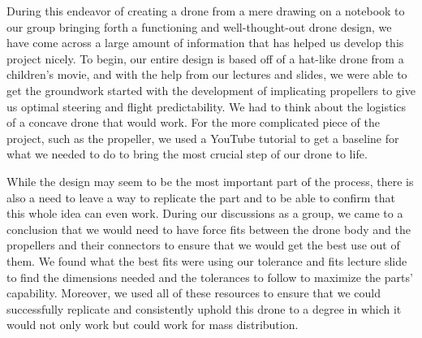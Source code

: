 
During this endeavor of creating a drone from a mere drawing on a notebook to our group bringing forth a functioning and well-thought-out drone design, we have come across a large amount of information that has helped us develop this project nicely. To begin, our entire design is based off of a hat-like drone from a children's movie, and with the help from our lectures and slides, we were able to get the groundwork started with the development of implicating propellers to give us optimal steering and flight predictability. We had to think about the logistics of a concave drone that would work. For the more complicated piece of the project, such as the propeller, we used a YouTube tutorial to get a baseline for what we needed to do to bring the most crucial step of our drone to life. \par

While the design may seem to be the most important part of the process, there is also a need to leave a way to replicate the part and to be able to confirm that this whole idea can even work. During our discussions as a group, we came to a conclusion that we would need to have force fits between the drone body and the propellers and their connectors to ensure that we would get the best use out of them. We found what the best fits were using our tolerance and fits lecture slide to find the dimensions needed and the tolerances to follow to maximize the parts’ capability. Moreover, we used all of these resources to ensure that we could successfully replicate and consistently uphold this drone to a degree in which it would not only work but could work for mass distribution. \par